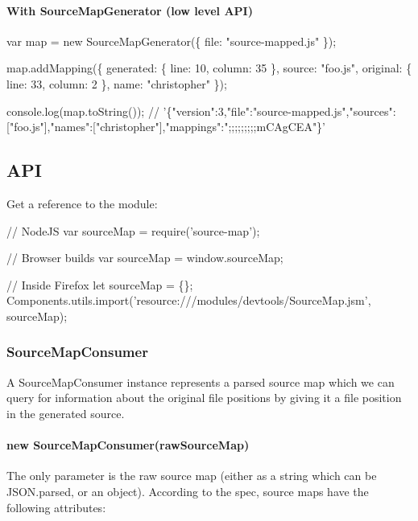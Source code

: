\paragraph*{With Source\+Map\+Generator (low level A\+PI)}


\begin{DoxyCode}
var map = new SourceMapGenerator(\{
  file: "source-mapped.js"
\});

map.addMapping(\{
  generated: \{
    line: 10,
    column: 35
  \},
  source: "foo.js",
  original: \{
    line: 33,
    column: 2
  \},
  name: "christopher"
\});

console.log(map.toString());
//
       '\{"version":3,"file":"source-mapped.js","sources":["foo.js"],"names":["christopher"],"mappings":";;;;;;;;;mCAgCEA"\}'
\end{DoxyCode}


\subsection*{A\+PI}

Get a reference to the module\+:


\begin{DoxyCode}
// NodeJS
var sourceMap = require('source-map');

// Browser builds
var sourceMap = window.sourceMap;

// Inside Firefox
let sourceMap = \{\};
Components.utils.import('resource:///modules/devtools/SourceMap.jsm', sourceMap);
\end{DoxyCode}


\subsubsection*{Source\+Map\+Consumer}

A Source\+Map\+Consumer instance represents a parsed source map which we can query for information about the original file positions by giving it a file position in the generated source.

\paragraph*{new Source\+Map\+Consumer(raw\+Source\+Map)}

The only parameter is the raw source map (either as a string which can be {\ttfamily J\+S\+O\+N.\+parse}\textquotesingle{}d, or an object). According to the spec, source maps have the following attributes\+:


